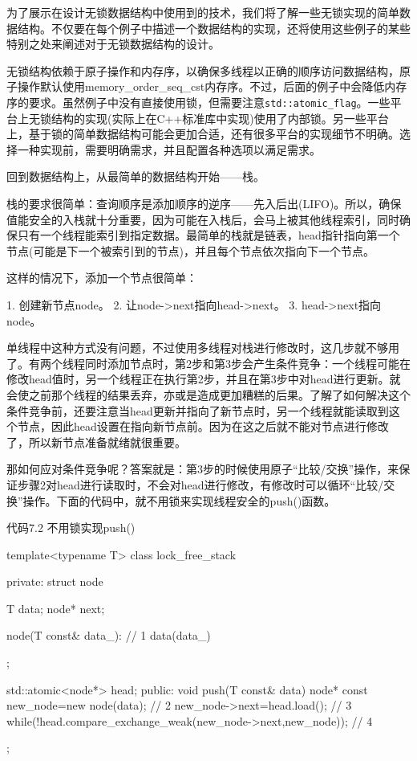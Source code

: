 
为了展示在设计无锁数据结构中使用到的技术，我们将了解一些无锁实现的简单数据结构。不仅要在每个例子中描述一个数据结构的实现，还将使用这些例子的某些特别之处来阐述对于无锁数据结构的设计。

无锁结构依赖于原子操作和内存序，以确保多线程以正确的顺序访问数据结构，原子操作默认使用memory\_order\_seq\_cst内存序。不过，后面的例子中会降低内存序的要求。虽然例子中没有直接使用锁，但需要注意\texttt{std::atomic\_flag}。一些平台上无锁结构的实现(实际上在C++标准库中实现)使用了内部锁。另一些平台上，基于锁的简单数据结构可能会更加合适，还有很多平台的实现细节不明确。选择一种实现前，需要明确需求，并且配置各种选项以满足需求。

回到数据结构上，从最简单的数据结构开始——栈。


栈的要求很简单：查询顺序是添加顺序的逆序——先入后出(LIFO)。所以，确保值能安全的入栈就十分重要，因为可能在入栈后，会马上被其他线程索引，同时确保只有一个线程能索引到指定数据。最简单的栈就是链表，head指针指向第一个节点(可能是下一个被索引到的节点)，并且每个节点依次指向下一个节点。

这样的情况下，添加一个节点很简单：

1. 创建新节点node。
2. 让node->next指向head->next。
3. head->next指向node。

单线程中这种方式没有问题，不过使用多线程对栈进行修改时，这几步就不够用了。有两个线程同时添加节点时，第2步和第3步会产生条件竞争：一个线程可能在修改head值时，另一个线程正在执行第2步，并且在第3步中对head进行更新。就会使之前那个线程的结果丢弃，亦或是造成更加糟糕的后果。了解了如何解决这个条件竞争前，还要注意当head更新并指向了新节点时，另一个线程就能读取到这个节点，因此head设置在指向新节点前。因为在这之后就不能对节点进行修改了，所以新节点准备就绪就很重要。

那如何应对条件竞争呢？答案就是：第3步的时候使用原子“比较/交换”操作，来保证步骤2对head进行读取时，不会对head进行修改，有修改时可以循环“比较/交换”操作。下面的代码中，就不用锁来实现线程安全的push()函数。

代码7.2 不用锁实现push()

\begin{cpp}
template<typename T>
class lock_free_stack
{
private:
  struct node
  {
    T data;
    node* next;

    node(T const& data_):  // 1
     data(data_)
    {}
  };

  std::atomic<node*> head;
public:
  void push(T const& data)
  {
    node* const new_node=new node(data); // 2
    new_node->next=head.load();  // 3
    while(!head.compare_exchange_weak(new_node->next,new_node));  // 4
  }
};
\end{cpp}

